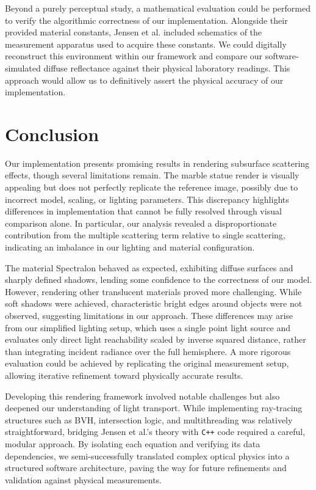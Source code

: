 \documentclass[sigconf,nonacm]{acmart}
\begin{document}
Beyond a purely perceptual study, a mathematical evaluation could be performed to verify the algorithmic correctness of our implementation. Alongside their provided material constants, Jensen et al. included schematics of the measurement apparatus used to acquire these constants. We could digitally reconstruct this environment within our framework and compare our software-simulated diffuse reflectance against their physical laboratory readings. This approach would allow us to definitively assert the physical accuracy of our implementation.

\section{Conclusion}

Our implementation presents promising results in rendering subsurface scattering effects, though several limitations remain. The marble statue render is visually appealing but does not perfectly replicate the reference image, possibly due to incorrect model, scaling, or lighting parameters. This discrepancy highlights differences in implementation that cannot be fully resolved through visual comparison alone. In particular, our analysis revealed a disproportionate contribution from the multiple scattering term relative to single scattering, indicating an imbalance in our lighting and material configuration.

The material Spectralon behaved as expected, exhibiting diffuse surfaces and sharply defined shadows, lending some confidence to the correctness of our model. However, rendering other translucent materials proved more challenging. While soft shadows were achieved, characteristic bright edges around objects were not observed, suggesting limitations in our approach. These differences may arise from our simplified lighting setup, which uses a single point light source and evaluates only direct light reachability scaled by inverse squared distance, rather than integrating incident radiance over the full hemisphere. A more rigorous evaluation could be achieved by replicating the original measurement setup, allowing iterative refinement toward physically accurate results.

Developing this rendering framework involved notable challenges but also deepened our understanding of light transport. While implementing ray-tracing structures such as BVH, intersection logic, and multithreading was relatively straightforward, bridging Jensen et al.'s theory with \texttt{C++} code required a careful, modular approach. By isolating each equation and verifying its data dependencies, we semi-successfully translated complex optical physics into a structured software architecture, paving the way for future refinements and validation against physical measurements.
\end{document}
